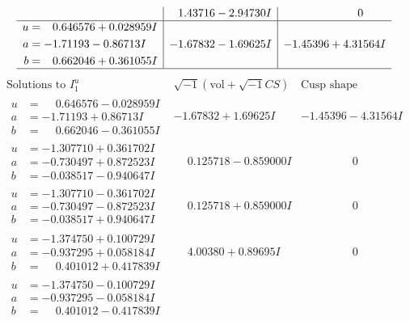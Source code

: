 \documentclass[1p]{elsarticle_modified}
\theoremstyle{definition}
\newcommand{\I}{\sqrt{-1}}
\begin{document}
$$\begin{array}{c|c|c}
 & \phantom{-}1.43716 - 2.94730 I & \phantom{-0.000000 } 0 \\ \hline\begin{aligned}
u &= \phantom{-}0.646576 + 0.028959 I \\
a &= -1.71193 - 0.86713 I \\
b &= \phantom{-}0.662046 + 0.361055 I\end{aligned}
 & -1.67832 - 1.69625 I & -1.45396 + 4.31564 I\\
 \hline 
 \end{array}$$\newpage$$\begin{array}{c|c|c}  
\text{Solutions to }I^u_{1}& \I (\text{vol} + \sqrt{-1}CS) & \text{Cusp shape}\\
 \hline 
\begin{aligned}
u &= \phantom{-}0.646576 - 0.028959 I \\
a &= -1.71193 + 0.86713 I \\
b &= \phantom{-}0.662046 - 0.361055 I\end{aligned}
 & -1.67832 + 1.69625 I & -1.45396 - 4.31564 I \\ \hline\begin{aligned}
u &= -1.307710 + 0.361702 I \\
a &= -0.730497 + 0.872523 I \\
b &= -0.038517 - 0.940647 I\end{aligned}
 & \phantom{-}0.125718 - 0.859000 I & \phantom{-0.000000 } 0 \\ \hline\begin{aligned}
u &= -1.307710 - 0.361702 I \\
a &= -0.730497 - 0.872523 I \\
b &= -0.038517 + 0.940647 I\end{aligned}
 & \phantom{-}0.125718 + 0.859000 I & \phantom{-0.000000 } 0 \\ \hline\begin{aligned}
u &= -1.374750 + 0.100729 I \\
a &= -0.937295 + 0.058184 I \\
b &= \phantom{-}0.401012 + 0.417839 I\end{aligned}
 & \phantom{-}4.00380 + 0.89695 I & \phantom{-0.000000 } 0 \\ \hline\begin{aligned}
u &= -1.374750 - 0.100729 I \\
a &= -0.937295 - 0.058184 I \\
b &= \phantom{-}0.401012 - 0.417839 I\end{aligned}

\end{array}$$
\end{document}
